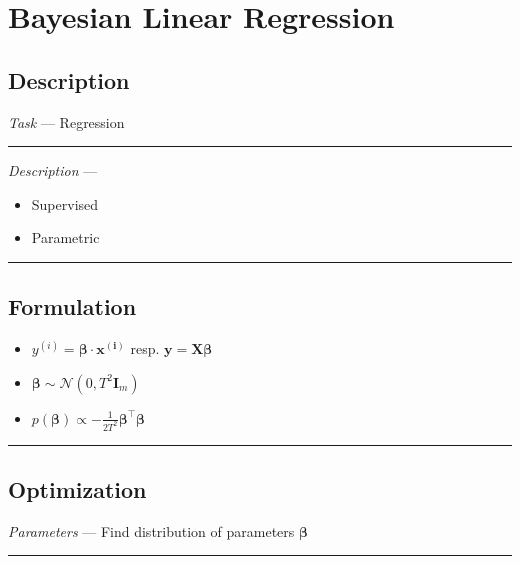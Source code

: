 \section{Bayesian Linear Regression}
\subsection*{Description}
\emph{Task} --- Regression

{\color{lightgray}\hrule height 0.001mm}

\emph{Description} --- 
\begin{itemize}
    \item Supervised 
    \item Parametric
\end{itemize}

{\color{black}\hrule height 0.001mm}

\subsection*{Formulation}

\begin{itemize}
    \item $y^{(i)} = \boldsymbol{\beta} \cdot \boldsymbol{x^{(i)}}$ resp. $\boldsymbol{y} = \boldsymbol{X}\boldsymbol{\beta}$
    \item $\boldsymbol{\beta} \sim \mathcal{N} (0,T^2 \boldsymbol{I}_m)$
    \item $p(\boldsymbol{\beta}) \propto -\frac{1}{2T^2} \boldsymbol{\beta}^\intercal \boldsymbol{\beta}$
\end{itemize}

{\color{black}\hrule height 0.001mm}

\subsection*{Optimization}
\emph{Parameters} --- Find distribution of parameters $\boldsymbol{\beta}$

{\color{lightgray}\hrule height 0.001mm}

